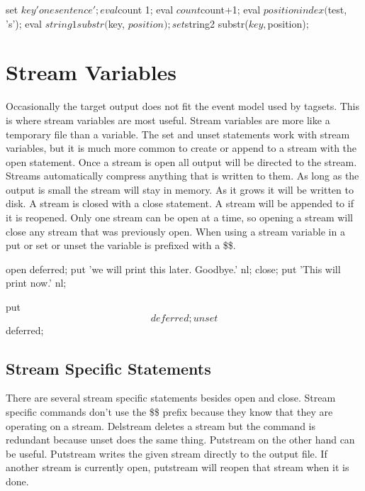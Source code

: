 \begin{sfvcode}
      set $key 'one sentence';
      eval $count 1;
      eval $count $count+1;
      eval $position index($test, 's');
      eval $string1 substr($key, $position);
      set $string2 substr($key, $position);
\end{sfvcode}

\section{Stream Variables}
Occasionally the target output does not fit the event model
used by tagsets.  This is where stream variables are most useful.  Stream
variables are more like a temporary file than a variable.  The set and unset
statements work with stream variables, but it is much more common to create or append
to a stream with the open statement.  Once a stream is open all output will
be directed to the stream.  Streams automatically compress anything that
is written to them. As long as the output is small the stream will
stay in memory.  As it grows it will be written to disk.  A stream is
closed with a close statement.  A stream will be appended to if it is reopened.
Only one stream can be open at a time, so
opening a stream will close any stream that was previously open.  When 
using a stream variable in a put or set or unset the variable is prefixed with a \$\$.

\begin{sfvcode}  
     open deferred;
         put 'we will print this later.  Goodbye.' nl;
     close;
     put 'This will print now.' nl;

     put $$deferred;

     unset $$deferred;

\end{sfvcode}  

\subsection{Stream Specific Statements}
There are several stream specific statements besides open and close.  
Stream specific commands don't use the \$\$ prefix because they know that
they are operating on a stream.  Delstream deletes a stream but the command
is redundant because unset does the same thing.  Putstream on the other hand
can be useful.  Putstream writes the given stream directly to the output file.
If another stream is currently open, putstream will reopen that stream when it
is done.  


